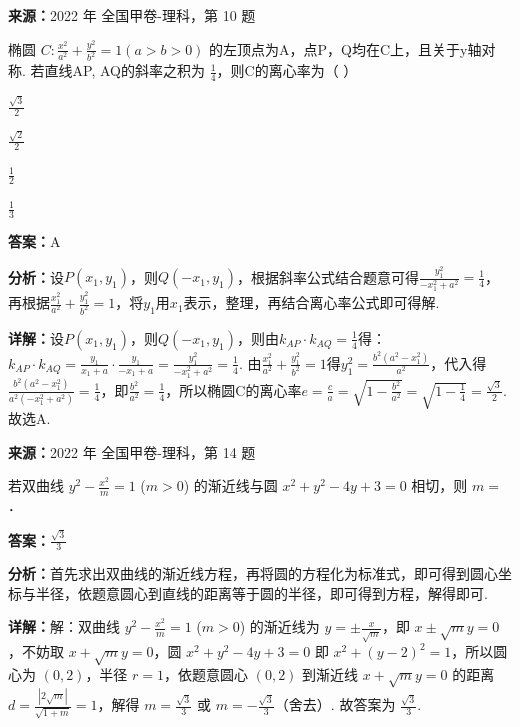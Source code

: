 \begin{question}[points=5]
\textbf{来源：}2022 年 全国甲卷-理科，第 10 题\par
椭圆 $C:\frac{x^2}{a^2}+\frac{y^2}{b^2}=1(a>b>0)$ 的左顶点为A，点P，Q均在C上，且关于y轴对称. 若直线AP, AQ的斜率之积为 $\frac{1}{4}$，则C的离心率为（ ）
\begin{choices}
  \item $\frac{\sqrt{3}}{2}$
  \item $\frac{\sqrt{2}}{2}$
  \item $\frac{1}{2}$
  \item $\frac{1}{3}$
\end{choices}
\begin{solution}
\textbf{答案：}A

\textbf{分析：}设$P(x_1,y_1)$，则$Q(-x_1,y_1)$，根据斜率公式结合题意可得$\frac{y_1^2}{-x_1^2+a^2}=\frac{1}{4}$，再根据$\frac{x_1^2}{a^2}+\frac{y_1^2}{b^2}=1$，将$y_1$用$x_1$表示，整理，再结合离心率公式即可得解.

\textbf{详解：}设$P(x_1,y_1)$，则$Q(-x_1,y_1)$，则由$k_{AP}\cdot k_{AQ}=\frac{1}{4}$得：$k_{AP}\cdot k_{AQ}=\frac{y_1}{x_1+a}\cdot\frac{y_1}{-x_1+a}=\frac{y_1^2}{-x_1^2+a^2}=\frac{1}{4}$. 由$\frac{x_1^2}{a^2}+\frac{y_1^2}{b^2}=1$得$y_1^2=\frac{b^2(a^2-x_1^2)}{a^2}$，代入得$\frac{b^2(a^2-x_1^2)}{a^2(-x_1^2+a^2)}=\frac{1}{4}$，即$\frac{b^2}{a^2}=\frac{1}{4}$，所以椭圆C的离心率$e=\frac{c}{a}=\sqrt{1-\frac{b^2}{a^2}}=\sqrt{1-\frac{1}{4}}=\frac{\sqrt{3}}{2}$. 故选A.
\end{solution}
\end{question}

\begin{question}[points=5]
\textbf{来源：}2022 年 全国甲卷-理科，第 14 题\par
若双曲线 $y^2-\frac{x^2}{m}=1$ ($m>0$) 的渐近线与圆 $x^2+y^2-4y+3=0$ 相切，则 $m=$ ．
\begin{solution}
\textbf{答案：}$\frac{\sqrt{3}}{3}$

\textbf{分析：}首先求出双曲线的渐近线方程，再将圆的方程化为标准式，即可得到圆心坐标与半径，依题意圆心到直线的距离等于圆的半径，即可得到方程，解得即可.

\textbf{详解：}解：双曲线 $y^2-\frac{x^2}{m}=1$ ($m>0$) 的渐近线为 $y=\pm\frac{x}{\sqrt{m}}$，即 $x\pm\sqrt{m}y=0$，不妨取 $x+\sqrt{m}y=0$，圆 $x^2+y^2-4y+3=0$ 即 $x^2+(y-2)^2=1$，所以圆心为 $(0,2)$，半径 $r=1$，依题意圆心 $(0,2)$ 到渐近线 $x+\sqrt{m}y=0$ 的距离 $d=\frac{|2\sqrt{m}|}{\sqrt{1+m}}=1$，解得 $m=\frac{\sqrt{3}}{3}$ 或 $m=-\frac{\sqrt{3}}{3}$（舍去）. 故答案为 $\frac{\sqrt{3}}{3}$.
\end{solution}
\end{question}

